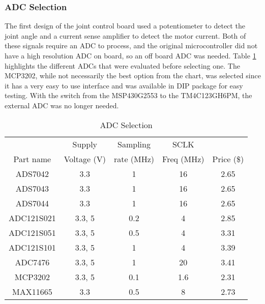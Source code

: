 \subsubsection{ADC Selection}
The first design of the joint control board used a potentiometer to detect the joint angle and a current sense amplifier to detect the motor current. Both of these signals require an ADC to process, and the original microcontroller did not have a high resolution ADC on board, so an off board ADC was needed. Table \ref{tbl:ADC Selection} highlights the different ADCs that were evaluated before selecting one. The MCP3202, while not necessarily the best option from the chart, was selected since it has a very easy to use interface and was available in DIP package for easy testing. With the switch from the MSP430G2553 to the TM4C123GH6PM, the external ADC was no longer needed.

\begin{table}[H]
	\centering
	\caption{ADC Selection}
	
	\begin{tabular}{|c|c|c|c|c|}
		\hline
		& Supply & Sampling & SCLK & \\
		Part name & Voltage (V) & rate (MHz) & Freq (MHz) & Price (\$) \\
		\hline
		ADS7042 & 3.3 & 1 & 16 & 2.65 \\
		
		ADS7043 & 3.3 & 1 & 16 & 2.65 \\
		
		ADS7044 & 3.3 & 1 & 16 & 2.65 \\
		
		ADC121S021 & 3.3, 5 & 0.2 & 4 & 2.85 \\
		
		ADC121S051 & 3.3, 5 & 0.5 & 4 & 3.31 \\
		
		ADC121S101 & 3.3, 5 & 1 & 4 & 3.39 \\
		
		ADC7476 & 3.3, 5 & 1 & 20 & 3.41 \\
		
		MCP3202 & 3.3, 5 & 0.1 & 1.6 & 2.31 \\
		
		MAX11665 & 3.3 & 0.5 & 8 & 2.73 \\
		\hline
	\end{tabular}
	
	\label{tbl:ADC Selection}
\end{table}

